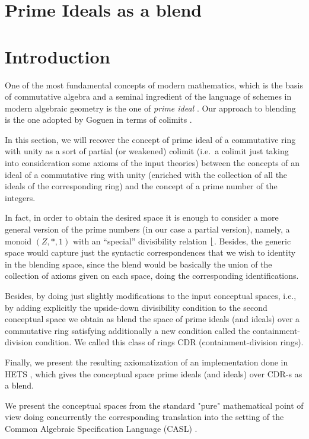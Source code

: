 \section{Prime Ideals as a blend}
\label{sec:prime_ideals}

\section*{Introduction}
One of the most fundamental concepts of modern mathematics, which is
the basis of commutative algebra and a seminal ingredient of the
language of schemes in modern algebraic geometry is the one of
\emph{prime ideal} \parencite{EGAI,eisenbud}.  Our approach to
blending is the one adopted by Goguen in terms of colimits
\parencite{Gog99,Goguen01,Gog05c}.


In this section, we will recover the concept of prime ideal of a
commutative ring with unity as a sort of partial (or weakened) colimit
(i.e.\ a colimit just taking into consideration some axioms of the
input theories) between the concepts of an ideal of a commutative ring
with unity (enriched with the collection of all the ideals of the
corresponding ring) and the concept of a prime number of the integers.

In fact, in order to obtain the desired space it is enough to consider
a more general version of the prime numbers (in our case a partial
version), namely, a monoid $(Z,*,1)$ with an ``special'' divisibility
relation $\lfloor$. Besides, the generic space would capture just
the syntactic correspondences that we wish to identity in the blending
space, since the blend would be basically the union of the collection
of axioms given on each space, doing the corresponding
identifications.

Besides, by doing just slightly modifications to the input conceptual
spaces, i.e., by adding explicitly the upside-down divisibility
condition to the second conceptual space we obtain as blend the space
of prime ideals (and ideals) over a commutative ring satisfying
additionally a new condition called the containment-division
condition. We called this class of rings CDR (containment-division
rings).

Finally, we present the resulting axiomatization of an implementation
done in HETS \parencite{Mossakowskihets}, which gives the conceptual space
prime ideals (and ideals) over CDR-s as a blend.

We present the conceptual spaces from the standard "pure" mathematical point of view doing concurrently the corresponding translation into the setting of the Common Algebraic Specification Language (CASL) \parencite{BidoitMosses2004}.
